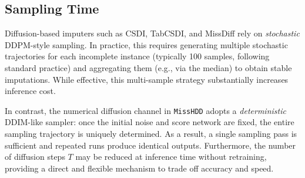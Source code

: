 \documentclass[times, review, 10pt]{elsarticle}
\begin{document}
\subsection{Sampling Time}

Diffusion-based imputers such as CSDI, TabCSDI, and MissDiff rely on
\emph{stochastic} DDPM-style sampling. In practice, this requires generating
multiple stochastic trajectories for each incomplete instance (typically 100
samples, following standard practice) and aggregating them (e.g., via the
median) to obtain stable imputations. While effective, this multi-sample
strategy substantially increases inference cost.

In contrast, the numerical diffusion channel in \texttt{MissHDD} adopts a
\emph{deterministic} DDIM-like sampler: once the initial noise and score
network are fixed, the entire sampling trajectory is uniquely determined. As a
result, a single sampling pass is sufficient and repeated runs produce
identical outputs. Furthermore, the number of diffusion steps $T$ may be
reduced at inference time without retraining, providing a direct and flexible
mechanism to trade off accuracy and speed.
\end{document}
